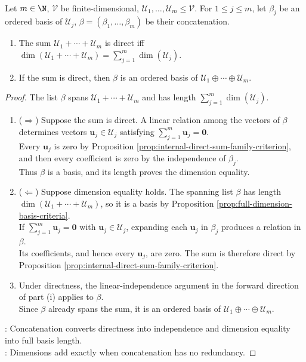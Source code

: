 \begin{theorem} \label{thm:direct-sum-iff-dimensions-add} \\
Let $m\in\N$, $\mathcal{V}$ be finite-dimensional, $\mathcal{U}_1,\ldots,\mathcal{U}_m\leq\mathcal{V}$. For $1\leq j\leq m$, let $\beta_j$ be an ordered basis of $\mathcal{U}_j$, $\beta=(\beta_1,\ldots,\beta_m)$ be their concatenation.
\begin{enumerate}[label=(\roman*)]
\setlength{\itemsep}{0pt}
\item The sum $\mathcal{U}_1+\cdots+\mathcal{U}_m$ is direct iff $\dim(\mathcal{U}_1+\cdots+\mathcal{U}_m)=\sum\limits_{j=1}^{m}\dim(\mathcal{U}_j)$.
\item If the sum is direct, then $\beta$ is an ordered basis of $\mathcal{U}_1\oplus\cdots\oplus\mathcal{U}_m$.
\end{enumerate}
\begin{proof}
The list $\beta$ spans $\mathcal{U}_1+\cdots+\mathcal{U}_m$ and has length $\sum\limits_{j=1}^{m}\dim(\mathcal{U}_j)$.
\begin{enumerate}[label=(\roman*)]
\setlength{\itemsep}{0pt}
\item[$(i)$] ($\Rightarrow$) Suppose the sum is direct. A linear relation among the vectors of $\beta$ determines vectors $\mathbf{u}_j\in\mathcal{U}_j$ satisfying $\sum\limits_{j=1}^{m}\mathbf{u}_j=\mathbf{0}$.\\
Every $\mathbf{u}_j$ is zero by Proposition \ref{prop:internal-direct-sum-family-criterion}, and then every coefficient is zero by the independence of $\beta_j$.\\
Thus $\beta$ is a basis, and its length proves the dimension equality.
\item[$(i)$] ($\Leftarrow$) Suppose dimension equality holds. The spanning list $\beta$ has length $\dim(\mathcal{U}_1+\cdots+\mathcal{U}_m)$, so it is a basis by Proposition \ref{prop:full-dimension-basis-criteria}.\\
If $\sum\limits_{j=1}^{m}\mathbf{u}_j=\mathbf{0}$ with $\mathbf{u}_j\in\mathcal{U}_j$, expanding each $\mathbf{u}_j$ in $\beta_j$ produces a relation in $\beta$.\\
Its coefficients, and hence every $\mathbf{u}_j$, are zero. The sum is therefore direct by Proposition \ref{prop:internal-direct-sum-family-criterion}.
\item[$(ii)$] Under directness, the linear-independence argument in the forward direction of part (i) applies to $\beta$.\\
Since $\beta$ already spans the sum, it is an ordered basis of $\mathcal{U}_1\oplus\cdots\oplus\mathcal{U}_m$.
\end{enumerate}
: Concatenation converts directness into independence and dimension equality into full basis length.\\
: Dimensions add exactly when concatenation has no redundancy.
\end{proof}
\end{theorem}

